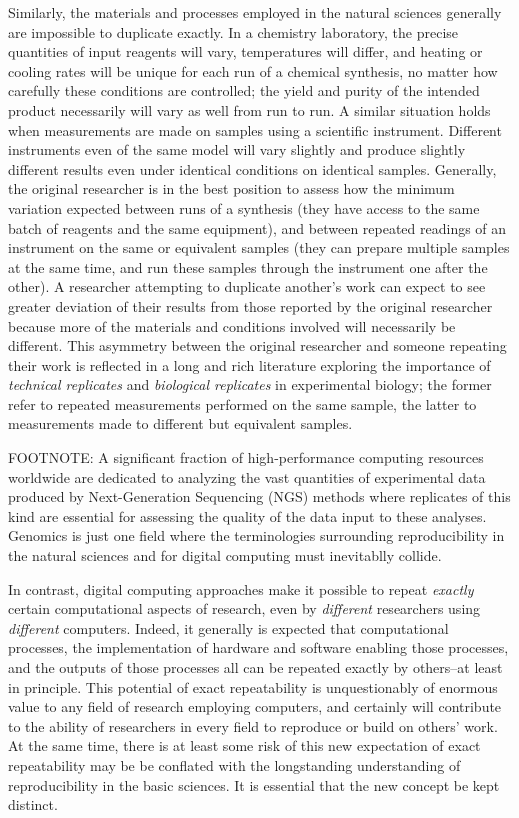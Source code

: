Similarly, the materials and processes employed in the natural sciences generally are impossible
	to duplicate exactly.
In a chemistry laboratory, the precise quantities of input reagents will vary, temperatures will differ, and heating
	or cooling rates will be unique for each run of a chemical synthesis, no matter how carefully these conditions
	are controlled; the yield and purity of the intended product necessarily will vary as well from run to run.
A similar situation holds when measurements are made on samples using a scientific instrument. 
Different instruments even of the same model will vary slightly and produce slightly different results even
	under identical conditions on identical samples.
Generally, the original researcher is in the best position to assess how the minimum variation expected
	between runs of a synthesis (they have access to the same batch of reagents and the same equipment), 
	and between repeated readings of an instrument on the same or equivalent samples (they can prepare
	multiple samples at the same time, and run these samples through the instrument one after the other).
A researcher attempting to duplicate another's work can expect to see greater deviation of their results from those reported
	by the original researcher because more of the materials and conditions involved will necessarily be different.
This asymmetry between the original researcher and someone repeating their work is reflected in a long and rich literature
	exploring the importance of \emph{technical replicates} and \emph{biological replicates} in experimental biology;
	the former refer to repeated measurements performed on the same sample, the latter to measurements made
	to different but equivalent samples.

FOOTNOTE: A significant fraction of high-performance computing resources worldwide are dedicated to analyzing the vast quantities of
	experimental data produced by Next-Generation Sequencing (NGS) methods where replicates of this kind are essential for
	assessing the quality of the data input to these analyses. Genomics is just one field where the terminologies surrounding
	reproducibility in the natural sciences and for digital computing must inevitablly collide.

In contrast, digital computing approaches make it possible to repeat \emph{exactly} certain computational aspects of research,
	 even by \emph{different} researchers using \emph{different} computers.  
Indeed, it generally is expected that computational processes, the implementation of hardware and software 
	enabling those processes, and the outputs of those processes all can be repeated exactly by others--at least in principle.
This potential of exact repeatability is unquestionably of enormous value to any field of research employing computers,
	and certainly will contribute to the ability of researchers in every field to reproduce or build on others' work.
At the same time, there is at least some risk of this new expectation of exact repeatability may be be conflated 
	with the longstanding understanding of reproducibility in the basic sciences. 
It is essential that the new concept be kept distinct.

